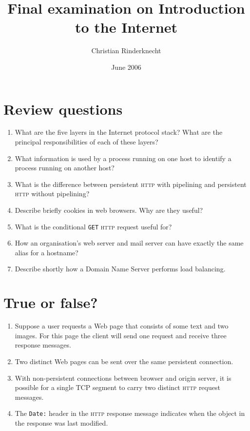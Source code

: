 \documentclass[11pt,a4paper]{article}
\title{Final examination on Introduction to the Internet}
\author{Christian Rinderknecht}
\date{June 2006}
\begin{document}
\maketitle

\section{Review questions}

\begin{enumerate}

  \item What are the five layers in the Internet protocol stack? What
    are the principal responsibilities of each of these layers?

  \item What information is used by a process running on one host to
    identify a process running on another host?

  \item What is the difference between persistent \textsc{http}
    with pipelining and persistent \textsc{http} without pipelining?

  \item Describe briefly cookies in web browsers. Why are they useful?

  \item What is the conditional \texttt{GET} \textsc{http} request
    useful for?

  \item How an organisation's web server and mail server can have
    exactly the same alias for a hostname?

  \item Describe shortly how a Domain Name Server performs load
    balancing.

\end{enumerate}

\section{True or false?}

  \begin{enumerate}

    \item Suppose a user requests a Web page that consists of some text
      and two images. For this page the client will send one request
      and receive three response messages.

    \item Two distinct Web pages can be sent over the same persistent
      connection.

    \item With non-persistent connections between browser and origin
      ser\-ver, it is possible for a single TCP segment to carry two
      distinct \textsc{http} request messages.

    \item The \verb+Date:+ header in the \textsc{http} response
      message indicates when the object in the response was last
      modified.

  \end{enumerate}
\end{document}
